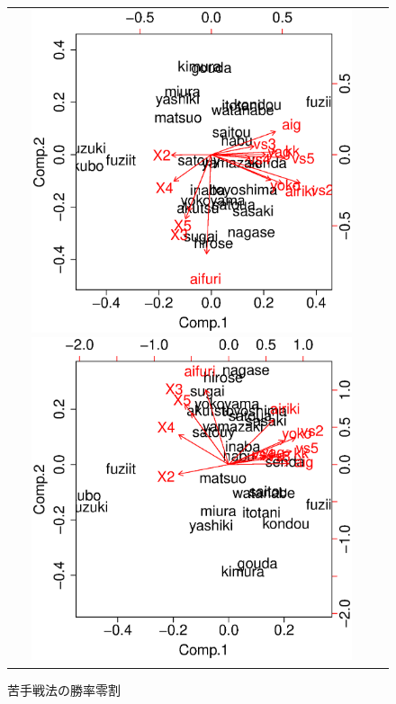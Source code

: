 \documentclass[11pt,a4paper,dvipdfmx]{jsarticle}
\begin{document}
\begin{figure}[h]
    \begin{tabular}{cc}
        \begin{minipage}[t]{0.47\hsize}
            \centering
            \includegraphics[width=0.9\textwidth]{graph/shougi-biplot.eps}
            \caption{苦手戦法の勝率三割}
        \end{minipage}
        \begin{minipage}[t]{0.47\hsize}
            \centering
            \includegraphics[width=0.9\textwidth]{graph/shougi-biplot0.eps}
            \caption{苦手戦法の勝率零割}
        \end{minipage}
    \end{tabular}
\end{figure}
\end{document}
